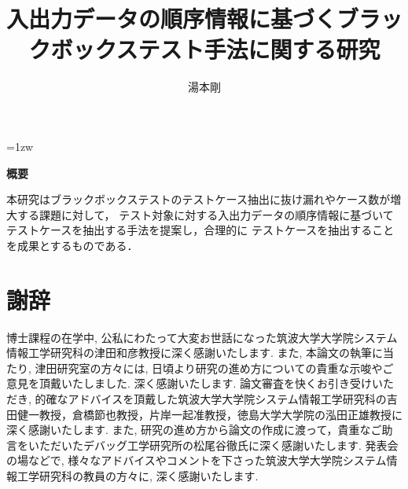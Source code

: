 \documentclass[a4paper,12pt]{jreport}
\title{入出力データの順序情報に基づくブラックボックステスト手法に関する研究}
\author{湯本剛}
\begin{document}
\maketitle
\thispagestyle{empty}
\newpage

\thispagestyle{empty}
\vspace*{20pt plus 1fil}
\parindent=1zw
\noindent
\begin{center}
{\bf 概要}
\vspace{5mm}
\end{center}
本研究はブラックボックステストのテストケース抽出に抜け漏れやケース数が増大する課題に対して，
テスト対象に対する入出力データの順序情報に基づいてテストケースを抽出する手法を提案し，合理的に
テストケースを抽出することを成果とするものである．


\par
\vspace{0pt plus 1fil}
\newpage

\tableofcontents
\listoffigures
\listoftables

\pagebreak \setcounter{page}{1}






%


\chapter*{謝辞}
博士課程の在学中, 公私にわたって大変お世話になった筑波大学大学院システム情報工学研究科の津田和彦教授に深く感謝いたします. また, 本論文の執筆に当たり, 津田研究室の方々には, 日頃より研究の進め方についての貴重な示唆やご意見を頂戴いたしました. 深く感謝いたします.
論文審査を快くお引き受けいただき, 的確なアドバイスを頂戴した筑波大学大学院システム情報工学研究科の吉田健一教授，倉橋節也教授，片岸一起准教授，徳島大学大学院の泓田正雄教授に深く感謝いたします. また, 研究の進め方から論文の作成に渡って，貴重なご助言をいただいたデバッグ工学研究所の松尾谷徹氏に深く感謝いたします.
発表会の場などで, 様々なアドバイスやコメントを下さった筑波大学大学院システム情報工学研究科の教員の方々に, 深く感謝いたします.
\end{document}
